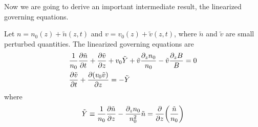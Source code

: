 Now we are going to derive an important intermediate result, the linearized governing equations.
\begin{proposition}
    Let $n = n_0(z) + \tilde{n}(z,t)$ and $v = v_0(z) + \tilde{v}(z,t)$, where $\tilde{n}$ and $\tilde{v}$ are small perturbed quantities. The linearized governing equations are
    \begin{align}
        &\frac{1}{n_0}\pdv{\tilde{n}}{t} 
        + \pdv{\tilde{v}}{z} + v_0\tilde{Y} + \tilde{v}\frac{\partial_z n_0}{n_0} - \tilde{v}\frac{\partial_z B}{B} = 0 
        \label{eq:linearized-conservation-of-mass}
        \\
        &\pdv{\tilde{v}}{t} + \pdv{(v_0\tilde{v})}{z} = -\tilde{Y}
        \label{eq:linearized-conservation-of-momentum}
    \end{align}
    where 
    \[ \tilde{Y} \equiv \frac{1}{n_0}\pdv{\tilde{n}}{z} - \frac{\partial_z n_0}{n_0^2}\tilde{n} = \pdv{z}(\frac{\tilde{n}}{n_0}) \]
\end{proposition}

